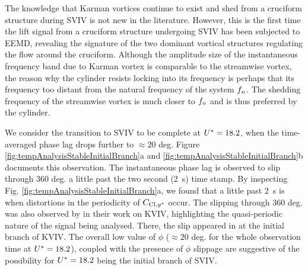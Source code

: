 \documentclass[oneside]{utmthesis}
\begin{document}
The knowledge that Karman vortices continue to exist and shed from a cruciform structure during SVIV is not new in the literature. However, this is the first time the lift signal from a cruciform structure undergoing SVIV has been subjected to EEMD, revealing the signature of the two dominant vortical structures regulating the flow around the cruciform. Although the amplitude size of the instantaneous frequency band due to Karman vortex is comparable to the streamwise vortex, the reason why the cylinder resists locking into its frequency is perhaps that its frequency too distant from the natural frequency of the system $f_{n}$. The shedding frequency of the streamwise vortex is much closer to $f_{n}$ and is thus preferred by the cylinder.

We consider the transition to SVIV to be complete at $U^{*} = 18.2$, when the time-averaged phase lag drops further to $\approx 20$ deg. Figure \ref{fig:tempAnalysisStableInitialBranch}a and \ref{fig:tempAnalysisStableInitialBranch}b documents this observation. The instantaneous phase lag is observed to slip through 360 deg. a little past the two second (\SI{2}{\second}) time stamp. By inspecting Fig. \ref{fig:tempAnalysisStableInitialBranch}a, we found that a little past \SI{2}{\second} is when distortions in the periodicity of $C_{\text{Cl},y^{*}}$ occur. The slipping through 360 deg. was also observed by \citet{Khalak1999} in their work on KVIV, highlighting the quasi-periodic nature of the signal being analysed. There, the slip appeared in \citet{Khalak1999} at the initial branch of KVIV. The overall low value of $\phi$ ($\approx 20$ deg. for the whole observation time at $U^{*} = 18.2$), coupled with the presence of $\phi$ slippage are suggestive of the possibility for $U^{*} = 18.2$ being the initial branch of SVIV.
\end{document}
